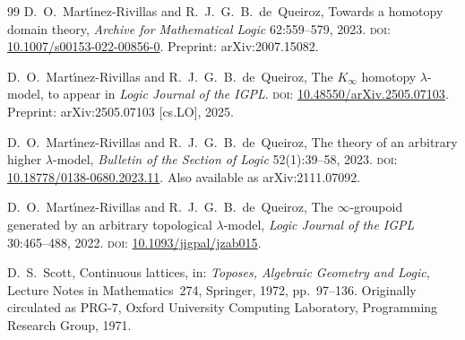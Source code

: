 \documentclass[webpdf,traditional,large,numbered]{oup-authoring-template}
\theoremstyle{thmstyleone}%
\theoremstyle{thmstyletwo}%
\theoremstyle{thmstylethree}%
\begin{document}
\begin{thebibliography}{99}
  D.~O.~Mart\'{\i}nez-Rivillas and R.~J.~G.~B.~de~Queiroz,
  Towards a homotopy domain theory,
  \emph{Archive for Mathematical Logic} 62:559--579, 2023.
  \textsc{doi}: \href{https://doi.org/10.1007/s00153-022-00856-0}{10.1007/s00153-022-00856-0}.
  Preprint: arXiv:2007.15082.

  D.~O.~Mart\'{\i}nez-Rivillas and R.~J.~G.~B.~de~Queiroz,
  The $K_\infty$ homotopy $\lambda$-model,
  to appear in \emph{Logic Journal of the IGPL}.
  \textsc{doi}: \href{https://doi.org/10.48550/arXiv.2505.07103}{10.48550/arXiv.2505.07103}.
  Preprint: arXiv:2505.07103 [cs.LO], 2025.

  D.~O.~Mart\'{\i}nez-Rivillas and R.~J.~G.~B.~de~Queiroz,
  The theory of an arbitrary higher $\lambda$-model,
  \emph{Bulletin of the Section of Logic} 52(1):39--58, 2023.
  \textsc{doi}: \href{https://doi.org/10.18778/0138-0680.2023.11}{10.18778/0138-0680.2023.11}.
  Also available as arXiv:2111.07092.

  D.~O.~Mart\'{\i}nez-Rivillas and R.~J.~G.~B.~de~Queiroz,
  The $\infty$-groupoid generated by an arbitrary topological $\lambda$-model,
  \emph{Logic Journal of the IGPL} 30:465--488, 2022.
  \textsc{doi}: \href{https://doi.org/10.1093/jigpal/jzab015}{10.1093/jigpal/jzab015}.

  D.~S.~Scott,
  Continuous lattices,
  in: \emph{Toposes, Algebraic Geometry and Logic},
  Lecture Notes in Mathematics~274, Springer, 1972, pp.~97--136.
  Originally circulated as PRG-7, Oxford University Computing Laboratory,
  Programming Research Group, 1971.

\end{thebibliography}
\end{document}
